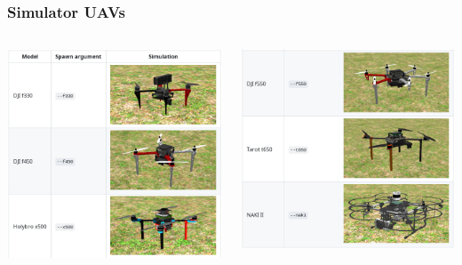 \documentclass[aspectratio=169]{beamer}
\begin{document}


\begin{frame}
  \frametitle{Simulator UAVs}

  \begin{columns}[c]

    \includegraphics[width=1.0\textwidth]{./fig/simulator_uavs_1.jpg}

    \includegraphics[width=1.0\textwidth]{./fig/simulator_uavs_2.jpg}

  \end{columns}

\end{frame}
\end{document}
